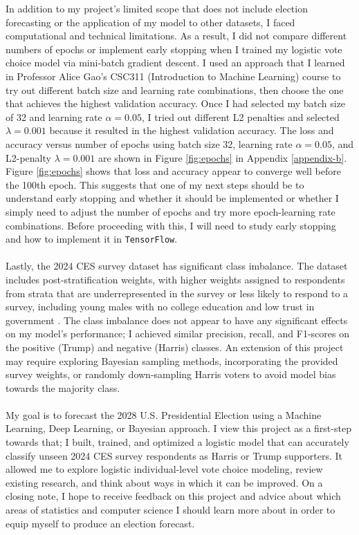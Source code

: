 \documentclass[letter]{article}
\begin{document}
In addition to my project’s limited scope that does not include election forecasting or the application of my model to other datasets, I faced computational and technical limitations. As a result, I did not compare different numbers of epochs or implement early stopping when I trained my logistic vote choice model via mini-batch gradient descent. I used an approach that I learned in Professor Alice Gao's CSC311 (Introduction to Machine Learning) course to try out different batch size and learning rate combinations, then choose the one that achieves the highest validation accuracy.  Once I had selected my batch size of 32 and learning rate $\alpha=0.05$, I tried out different L2 penalties and selected $\lambda=0.001$ because it resulted in the highest validation accuracy. The loss and accuracy versus number of epochs using batch size 32, learning rate $\alpha=0.05$, and L2-penalty $\lambda=0.001$ are shown in Figure \ref{fig:epochs} in Appendix \ref{appendix-b}. Figure \ref{fig:epochs} shows that loss and accuracy appear to converge well before the 100th epoch. This suggests that one of my next steps should be to understand early stopping and whether it should be implemented or whether I simply need to adjust the number of epochs and try more epoch-learning rate combinations. Before proceeding with this, I will need to study early stopping and how to implement it in \texttt{TensorFlow}. \\
\\
Lastly, the 2024 CES survey dataset has significant class imbalance. The dataset includes post-stratification weights, with higher weights assigned to respondents from strata that are underrepresented in the survey or less likely to respond to a survey, including young males with no college education and low trust in government \cite{ces}. The class imbalance does not appear to have any significant effects on my model's performance; I achieved similar precision, recall, and F1-scores on the positive (Trump) and negative (Harris) classes. An extension of this project may require exploring Bayesian sampling methods, incorporating the provided survey weights, or randomly down-sampling Harris voters to avoid model bias towards the majority class. \\
\\
My goal is to forecast the 2028 U.S. Presidential Election using a Machine Learning, Deep Learning, or Bayesian approach. I view this project as a first-step towards that; I built, trained, and optimized a logistic model that can accurately classify unseen 2024 CES survey respondents as Harris or Trump supporters. It allowed me to explore logistic individual-level vote choice modeling, review existing research, and think about ways in which it can be improved. On a closing note, I hope to receive feedback on this project and advice about which areas of statistics and computer science I should learn more about in order to equip myself to produce an election forecast.
\end{document}
